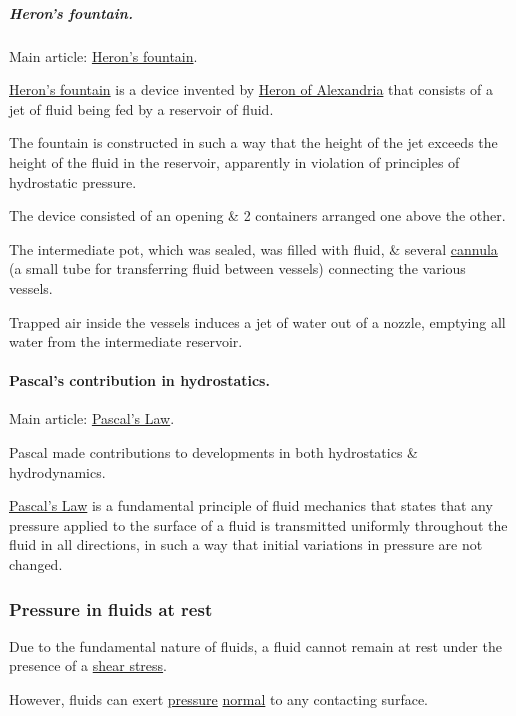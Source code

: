 \documentclass{article}
\begin{document}
\subparagraph{Heron's fountain.} Main article: \href{https://en.wikipedia.org/wiki/Heron's_fountain}{Heron's fountain}.

%
\href{https://en.wikipedia.org/wiki/Heron's_fountain}{Heron's fountain} is a device invented by \href{https://en.wikipedia.org/wiki/Heron_of_Alexandria}{Heron of Alexandria} that consists of a jet of fluid being fed by a reservoir of fluid.

The fountain is constructed in such a way that the height of the jet exceeds the height of the fluid in the reservoir, apparently in violation of principles of hydrostatic pressure.

The device consisted of an opening \& 2 containers arranged one above the other.

The intermediate pot, which was sealed, was filled with fluid, \& several \href{https://en.wikipedia.org/wiki/Cannula}{cannula} (a small tube for transferring fluid between vessels) connecting the various vessels.

Trapped air inside the vessels induces a jet of water out of a nozzle, emptying all water from the intermediate reservoir. 

\paragraph{Pascal's contribution in hydrostatics.} Main article: \href{https://en.wikipedia.org/wiki/Pascal's_Law}{Pascal's Law}.

%
Pascal made contributions to developments in both hydrostatics \& hydrodynamics.

\href{https://en.wikipedia.org/wiki/Pascal's_Law}{Pascal's Law} is a fundamental principle of fluid mechanics that states that any pressure applied to the surface of a fluid is transmitted uniformly throughout the fluid in all directions, in such a way that initial variations in pressure are not changed.

\subsubsection{Pressure in fluids at rest}
Due to the fundamental nature of fluids, a fluid cannot remain at rest under the presence of a \href{https://en.wikipedia.org/wiki/Shear_stress}{shear stress}.

However, fluids can exert \href{https://en.wikipedia.org/wiki/Pressure}{pressure} \href{https://en.wikipedia.org/wiki/Surface_normal}{normal} to any contacting surface.
\end{document}
